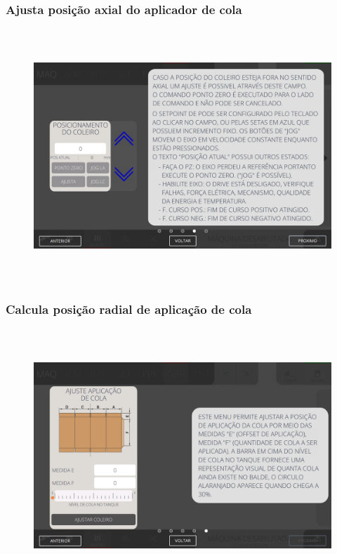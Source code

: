 \newpage
\thispagestyle{fancy}
\vspace*{\fill}
\subsubsection{\small{Ajusta posição axial do aplicador de cola}}
\begin{figure}[h]
  \centering
  \includegraphics[width=576px,height=360px]{src/imagesFlexo/07-fold/settings/e-4.png}
\end{figure}
\vspace*{\fill}

\newpage
\thispagestyle{fancy}
\vspace*{\fill}
\subsubsection{\small{Calcula posição radial de aplicação de cola}}
\begin{figure}[h]
  \centering
  \includegraphics[width=576px,height=360px]{src/imagesFlexo/07-fold/settings/e-5.png}
\end{figure}
\vspace*{\fill}

